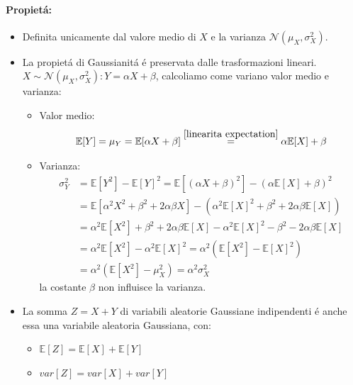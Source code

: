             \paragraph{Propietá:}\label{propieta distr gaussiana}
            \begin{itemize}
                \item {Definita unicamente dal valore medio di $X$ e la varianza $\mathcal{N}(\mu_X,\sigma_X^2)$.}
                \item {\begin{sloppypar}
                    La propietá di Gaussianitá é preservata dalle trasformazioni lineari. ${X \sim \mathcal{N}(\mu_X,\sigma_X^2): Y = \alpha X+\beta}$, calcoliamo come variano 
                    valor medio e varianza:
                \end{sloppypar}
                    \begin{itemize}
                        \item {Valor medio:
                            \[
                                \mathbb{E}[Y] = \mu_Y = \mathbb{E}[\alpha X+\beta]  \overset{\ref{linearita expectation}}{=} \alpha \mathbb{E}[X] + \beta
                            \]
                        }
                        \item {Varianza:
                            \begin{align}
                                \sigma_Y^2  &= \mathbb{E}[Y^2] -\mathbb{E}[Y]^2 =\mathbb{E}[(\alpha X + \beta)^2] -(\alpha \mathbb{E}[X] + \beta)^2 \nonumber \\
                                            &= \mathbb{E}[\alpha^2 X^2 + \beta^2 +2\alpha\beta X] -(\alpha^2 \mathbb{E}[X]^2 + \beta^2 +2\alpha\beta\mathbb{E}[X])\nonumber \\
                                            &= \alpha^2 \mathbb{E}[X^2] + \beta^2 +2\alpha\beta \mathbb{E}[X] -\alpha^2 \mathbb{E}[X]^2 - \beta^2 -2\alpha\beta\mathbb{E}[X]\nonumber \\
                                            &= \alpha^2 \mathbb{E}[X^2] -\alpha^2 \mathbb{E}[X]^2 = \alpha^2 (\mathbb{E}[X^2] -\mathbb{E}[X]^2)\nonumber \\
                                            &= \alpha^2 (\mathbb{E}[X^2] -\mu_X^2)=\alpha^2 \sigma_X^2\nonumber
                            \end{align}                         
                            la costante $\beta$ non influisce la varianza.  
                        }
                    \end{itemize}}
                \item {La somma $Z = X+Y$ di variabili aleatorie Gaussiane indipendenti é anche essa una variabile aleatoria
                    Gaussiana, con:
                        \begin{itemize}
                            \item {$\mathbb{E}[Z] = \mathbb{E}[X] +\mathbb{E}[Y] $}
                            \item {$var[Z] = var[X] +var[Y] $}
                        \end{itemize}}
            \end{itemize}
